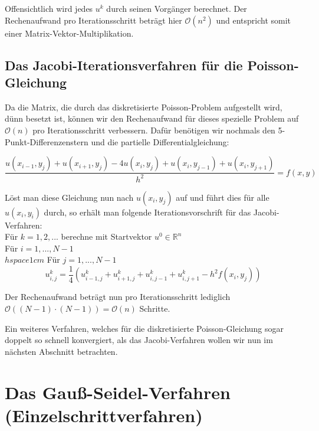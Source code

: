 Offensichtlich wird jedes $u^{k}$ durch seinen Vorgänger berechnet. Der Rechenaufwand pro Iterationsschritt beträgt hier $\mathcal{O}(n^{2})$ und entspricht somit einer Matrix-Vektor-Multiplikation.

\subsection{Das Jacobi-Iterationsverfahren für die Poisson-Gleichung}\label{ss.Jacobi-Verfahren der Poisson Gleichung}

Da die Matrix, die durch das diskretisierte Poisson-Problem aufgestellt wird, dünn besetzt ist, können wir den Rechenaufwand für dieses spezielle Problem auf $\mathcal{O}(n)$ pro Iterationsschritt verbessern. Dafür benötigen wir nochmals den 5-Punkt-Differenzenstern und die partielle Differentialgleichung:

\begin{equation}
\frac {u(x_{i-1},y_{j}) + u(x_{i+1},y_{j}) - 4u(x_{i},y_{j}) + u(x_{i},y_{j-1}) + u(x_{i},y_{j+1})} {h^{2}} = f(x,y)
\end{equation}

Löst man diese Gleichung nun nach $u(x_{i},y_{j})$ auf und führt dies für alle $u(x_{i},y_{i})$ durch, so erhält man folgende Iterationsvorschrift für das Jacobi-Verfahren: \\

Für $k = 1,2,...$ berechne mit Startvektor $u^{0} \in \mathbb{R}^{n}$ \\
Für $i = 1,...,N-1$ \\
$hspace{1cm}$ Für $j = 1,...,N-1$
\begin{equation}
u^{k}_{i,j} =   \frac {1} {4} (u^{k}_{i-1,j} + u^{k}_{i+1,j} + u^{k}_{i,j-1} + u^{k}_{i,j+1} - h^{2}f(x_{i},y_{j}))
\end{equation}

Der Rechenaufwand beträgt nun pro Iterationsschritt lediglich $\mathcal{O}((N-1) \cdot (N-1)) = \mathcal{O}(n)$ Schritte.

Ein weiteres Verfahren, welches für die diskretisierte Poisson-Gleichung sogar doppelt so schnell konvergiert, als das Jacobi-Verfahren wollen wir nun im nächsten Abschnitt betrachten.


\section{Das Gauß-Seidel-Verfahren (Einzelschrittverfahren)}\label{s.Das Gauss-Seidel-Verfahren}

